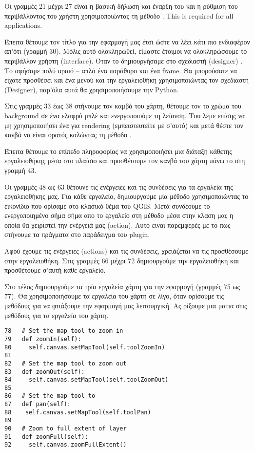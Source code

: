Οι γραμμές 21 μέχρι 27 είναι η βασική δήλωση και έναρξη του 
 και η ρύθμιση του περιβάλλοντος του χρήστη χρησιμοποιώντας τη μέθοδο
. This is required for all applications.

Έπειτα θέτουμε τον τίτλο για την εφαρμογή μας έτσι ώστε να λέει κάτι πιο ενδιαφέρον απ'ότι
  (γραμμή 30). Μόλις αυτό ολοκληρωθεί, είμαστε έτοιμοι να ολοκληρώσουμε το περιβάλλον χρήστη (interface). Όταν το δημιουργήσαμε στο σχεδιαστή (designer) . Το αφήσαμε πολύ αραιό – απλά ένα παράθυρο και ένα frame. Θα μπορούσατε να είχατε προσθέσει και ένα μενού και την εργαλειοθήκη χρησιμοποιώντας τον σχεδιαστή (Designer), παρ’όλα αυτά θα χρησιμοποιήσουμε την Python. 

Στις γραμμές 33 έως 38 στήνουμε τον καμβά του χάρτη, θέτουμε τον το χρώμα του background σε ένα ελαφρύ μπλέ και ενεργοποιούμε τη λείανση. Του λέμε επίσης να μη χρησιμοποιήσει ένα
 για rendering (εμπειστευτείτε με σ’αυτό) και μετά θέστε τον κανβά να είναι ορατός καλώντας τη μέθοδο .

Έπειτα θέτουμε το επίπεδο πληροφορίας να χρησιμοποιήσει μια διάταξη κάθετης εργαλειοθήκης μέσα στο πλαίσιο και προσθέτουμε τον κανβά του χάρτη πάνω το στη γραμμή 43.

Οι γραμμές 48 ως 63 θέτουνε τις ενέργειες και τις συνδέσεις για τα εργαλεία της εργαλειοθήκης μας. Για κάθε εργαλείο, δημιουργούμε μία μέθοδο  χρησιμοποιώντας το εικονίδιο που ορίσαμε στο κλασικό θέμα του QGIS. Μετά συνδέουμε το ενεργοποιημένο σήμα
 σήμα απο το εργαλείο στη μέθοδο μέσα στην κλαση μας η οποία θα χειριστεί την ενέργειά μας (action). Αυτό ειναι παρεμφερές με το πως στήνουμε τα πράγματα στο παράδειγμα του plugin. 

Αφού έχουμε τις ενέργειες (actions) και τις συνδέσεις, χρειάζεται να τις προσθέσουμε στην εργαλειοθήκη. Στις γραμμές 66 μέχρι 72 δημιουργούμε την εργαλειοθήκη και προσθέτουμε σ’αυτή  κάθε εργαλείο.

Στο τέλος δημιουργούμε τα τρία εργαλεία χάρτη για την εφαρμογή (γραμμές 75 ως 77). Θα χρησιμοποιήσουμε τα εργαλεία του χάρτη σε λίγο, όταν ορίσουμε τις μεθόδους για να φτιάξουμε την εφαρμογή μας λειτουργική. Ας ρίξουμε μια ματια στις μεθόδους για τα εργαλεία του χάρτη.

\begin{verbatim}
78   # Set the map tool to zoom in
79   def zoomIn(self):
80     self.canvas.setMapTool(self.toolZoomIn)
81 
82   # Set the map tool to zoom out
83   def zoomOut(self):
84     self.canvas.setMapTool(self.toolZoomOut)
85 
86   # Set the map tool to 
87   def pan(self):
88    self.canvas.setMapTool(self.toolPan)
89 
90   # Zoom to full extent of layer
91   def zoomFull(self):
92     self.canvas.zoomFullExtent()
\end{verbatim}

